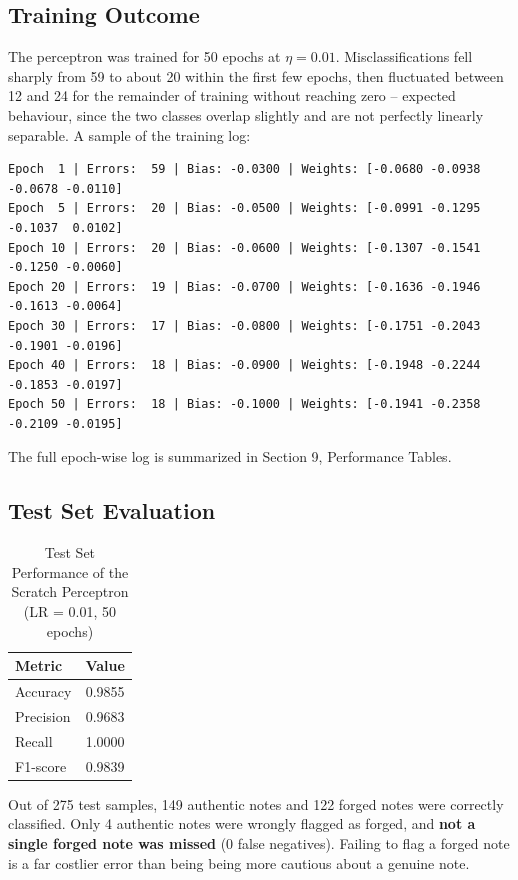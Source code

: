\documentclass[11pt]{article}
\begin{document}
\subsection*{Training Outcome}

The perceptron was trained for 50 epochs at $\eta = 0.01$. Misclassifications fell sharply from 59 to about 20 within the first few epochs, then fluctuated between 12 and 24 for the remainder of training without reaching zero -- expected behaviour, since the two classes overlap slightly and are not perfectly linearly separable. A sample of the training log:

\begin{verbatim}
Epoch  1 | Errors:  59 | Bias: -0.0300 | Weights: [-0.0680 -0.0938 -0.0678 -0.0110]
Epoch  5 | Errors:  20 | Bias: -0.0500 | Weights: [-0.0991 -0.1295 -0.1037  0.0102]
Epoch 10 | Errors:  20 | Bias: -0.0600 | Weights: [-0.1307 -0.1541 -0.1250 -0.0060]
Epoch 20 | Errors:  19 | Bias: -0.0700 | Weights: [-0.1636 -0.1946 -0.1613 -0.0064]
Epoch 30 | Errors:  17 | Bias: -0.0800 | Weights: [-0.1751 -0.2043 -0.1901 -0.0196]
Epoch 40 | Errors:  18 | Bias: -0.0900 | Weights: [-0.1948 -0.2244 -0.1853 -0.0197]
Epoch 50 | Errors:  18 | Bias: -0.1000 | Weights: [-0.1941 -0.2358 -0.2109 -0.0195]
\end{verbatim}

The full epoch-wise log is summarized in Section 9, Performance Tables.

\subsection*{Test Set Evaluation}

\begin{table}[H]
\centering
\caption{Test Set Performance of the Scratch Perceptron (LR = 0.01, 50 epochs)}
\begin{tabular}{lc}
\toprule
Metric & Value \\
\midrule
Accuracy & 0.9855 \\
Precision & 0.9683 \\
Recall & 1.0000 \\
F1-score & 0.9839 \\
\bottomrule
\end{tabular}
\end{table}

Out of 275 test samples, 149 authentic notes and 122 forged notes were correctly classified. Only 4 authentic notes were wrongly flagged as forged, and \textbf{not a single forged note was missed} (0 false negatives). Failing to flag a forged
note is a far costlier error than being being more cautious about a genuine note.
\end{document}

